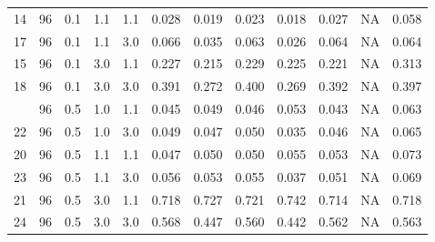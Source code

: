 \begin{longtable}[t]{cccccrrrrrrc}
14 & 96 & 0.1 & 1.1 & 1.1 & 0.028 & 0.019 & 0.023 & 0.018 & 0.027 & NA & 0.058\\
17 & 96 & 0.1 & 1.1 & 3.0 & 0.066 & 0.035 & 0.063 & 0.026 & 0.064 & NA & 0.064\\
15 & 96 & 0.1 & 3.0 & 1.1 & 0.227 & 0.215 & 0.229 & 0.225 & 0.221 & NA & 0.313\\
18 & 96 & 0.1 & 3.0 & 3.0 & 0.391 & 0.272 & 0.400 & 0.269 & 0.392 & NA & 0.397\\
\addlinespace
19 & 96 & 0.5 & 1.0 & 1.1 & 0.045 & 0.049 & 0.046 & 0.053 & 0.043 & NA & 0.063\\
22 & 96 & 0.5 & 1.0 & 3.0 & 0.049 & 0.047 & 0.050 & 0.035 & 0.046 & NA & 0.065\\
20 & 96 & 0.5 & 1.1 & 1.1 & 0.047 & 0.050 & 0.050 & 0.055 & 0.053 & NA & 0.073\\
23 & 96 & 0.5 & 1.1 & 3.0 & 0.056 & 0.053 & 0.055 & 0.037 & 0.051 & NA & 0.069\\
21 & 96 & 0.5 & 3.0 & 1.1 & 0.718 & 0.727 & 0.721 & 0.742 & 0.714 & NA & 0.718\\
24 & 96 & 0.5 & 3.0 & 3.0 & 0.568 & 0.447 & 0.560 & 0.442 & 0.562 & NA & 0.563\\
\bottomrule
\end{longtable}
\endgroup{}